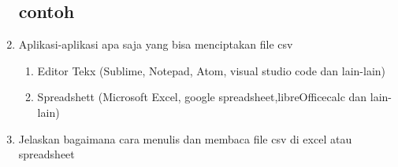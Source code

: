 \begin{enumerate}
\subsection{contoh}

\item Aplikasi-aplikasi apa saja yang bisa menciptakan file csv
\begin{enumerate}
\item Editor Tekx (Sublime, Notepad, Atom, visual studio code dan lain-lain) 
\item Spreadshett (Microsoft Excel, google spreadsheet,libreOfficecalc dan lain-lain)
\end{enumerate}
\item Jelaskan bagaimana cara menulis dan membaca file csv di excel atau spreadsheet
\begin{enumerate}

\end{enumerate}
\end{enumerate}
